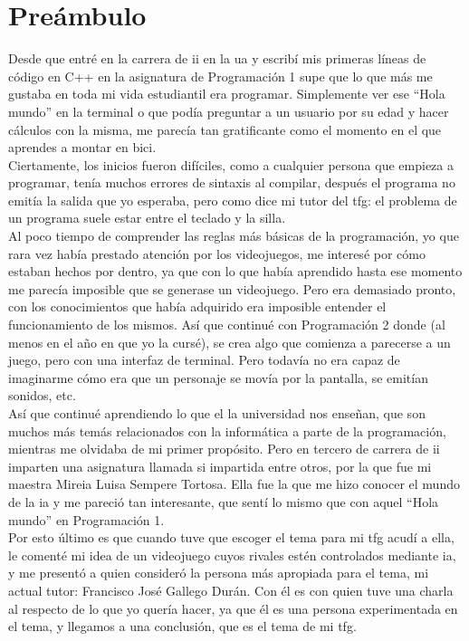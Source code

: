 
\chapter*{Preámbulo}
\thispagestyle{empty}
Desde que entré en la carrera de \gls{ii} en la \gls{ua} y escribí mis primeras líneas de código en C++ en la asignatura de Programación 1 supe que lo que más me gustaba en toda mi vida estudiantil era programar. Simplemente ver ese ``Hola mundo'' en la terminal o que podía preguntar a un usuario por su edad y hacer cálculos con la misma, me parecía tan gratificante como el momento en el que aprendes a montar en bici.
\\
Ciertamente, los inicios fueron difíciles, como a cualquier persona que empieza a programar, tenía muchos errores de sintaxis al compilar, después el programa no emitía la salida que yo esperaba, pero como dice mi tutor del \gls{tfg}: el problema de un programa suele estar entre el teclado y la silla.
\\
Al poco tiempo de comprender las reglas más básicas de la programación, yo que rara vez había prestado atención por los videojuegos, me interesé por cómo estaban hechos por dentro, ya que con lo que había aprendido hasta ese momento me parecía imposible que se generase un videojuego. Pero era demasiado pronto, con los conocimientos que había adquirido era imposible entender el funcionamiento de los mismos. Así que continué con Programación 2 donde (al menos en el año en que yo la cursé), se crea algo que comienza a parecerse a un juego, pero con una interfaz de terminal. Pero todavía no era capaz de imaginarme cómo era que un personaje se movía por la pantalla, se emitían sonidos, etc.
\\
Así que continué aprendiendo lo que el la universidad nos enseñan, que son muchos más temás relacionados con la informática a parte de la programación, mientras me olvidaba de mi primer propósito. Pero en tercero de carrera de \gls{ii} imparten una asignatura llamada \gls{si} impartida entre otros, por la que fue mi maestra Mireia Luisa Sempere Tortosa. Ella fue la que me hizo conocer el mundo de la \gls{ia} y me pareció tan interesante, que sentí lo mismo que con aquel ``Hola mundo'' en Programación 1.
\\
Por esto último es que cuando tuve que escoger el tema para mi \gls{tfg} acudí a ella, le comenté mi idea de un videojuego cuyos rivales estén controlados mediante \gls{ia}, y me presentó a quien consideró la persona más apropiada para el tema, mi actual tutor: Francisco José Gallego Durán. Con él es con quien tuve una charla al respecto de lo que yo quería hacer, ya que él es una persona experimentada en el tema, y llegamos a una conclusión, que es el tema de mi \gls{tfg}.


